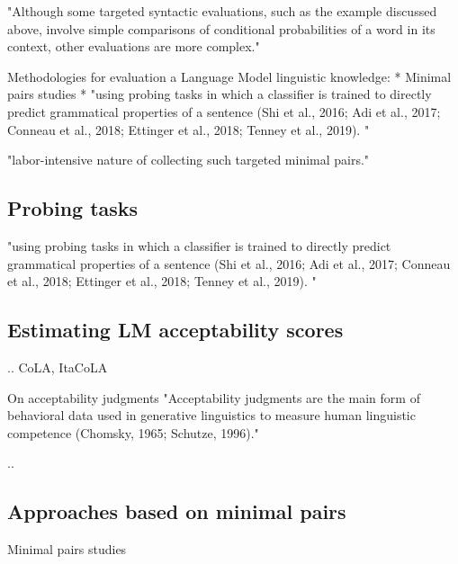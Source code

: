 "Although some targeted syntactic evaluations, such as the example discussed above, involve simple comparisons of conditional probabilities of a word in its context, other evaluations are more complex." \citep{hu2020systematic}

Methodologies for evaluation a Language Model linguistic knowledge:
* Minimal pairs studies \citep{warstadt2020blimp, linzen2016assessing, marvin2018targeted, wilcox2018rnn}
* "using probing tasks in which a classifier is trained to directly predict grammatical properties of a sentence  (Shi et al., 2016; Adi et al., 2017; Conneau et al., 2018; Ettinger et al., 2018; Tenney et al., 2019). "  \citep{warstadt2020blimp}	




"labor-intensive nature of collecting such targeted minimal pairs." \citep{warstadt2020blimp}	





\subsection{Probing tasks}

"using probing tasks in which a classifier is trained to directly predict grammatical properties of a sentence  (Shi et al., 2016; Adi et al.,
2017; Conneau et al., 2018; Ettinger et al., 2018;
Tenney et al., 2019). "  \citep{warstadt2020blimp}	


\subsection{Estimating LM acceptability scores}
..
CoLA, ItaCoLA


On acceptability judgments
"Acceptability judgments are the main form of behavioral data used in generative linguistics to measure human linguistic competence (Chomsky, 1965; Schutze, 1996)." \citep{warstadt2020blimp}	

..

\subsection{Approaches based on minimal pairs}
Minimal pairs studies \citep{warstadt2020blimp, linzen2016assessing, marvin2018targeted, wilcox2018rnn}

